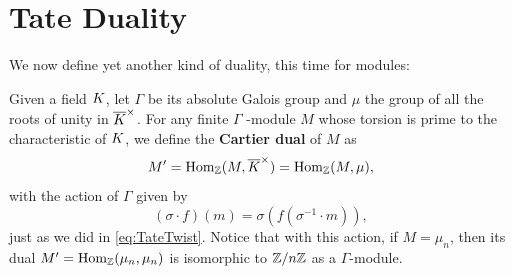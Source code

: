 \documentclass[a4paper, oneside]{memoir}
\begin{document}
\section{Tate Duality}
We now define yet another kind of duality, this time for modules:
\begin{definition}
	Given a field \(K\), let  $\Gamma$ be its absolute Galois group and $\mu$ the group of all the roots of unity in $\overline{K}^\times$.
	For any finite \(\Gamma\) -module \(M\) whose torsion is prime to the characteristic of \(K\), we define the \textbf{Cartier dual} of $M$ as
	\begin{equation*}
		M^{\prime} = \operatorname{Hom}_{\mathbb{Z}}(M, \overline{K}^\times)=\operatorname{Hom}_{\mathbb{Z}}(M, \mu),
	\end{equation*}
	with the action of $\Gamma$ given by
	\begin{equation*}
		(\sigma \cdot f)(m) = \sigma(f(\sigma^{-1}\cdot m)),
	\end{equation*}
	just as we did in \eqref{eq:TateTwist}.
	Notice that with this action, if $M=\mu_n$, then its dual $M^{\prime} = \operatorname{Hom}_{\mathbb{Z}}(\mu_n, \mu_n)$ is isomorphic to $\mathbb{Z}/n\mathbb{Z}$ as a $\Gamma$-module.
\end{definition}
\end{document}

